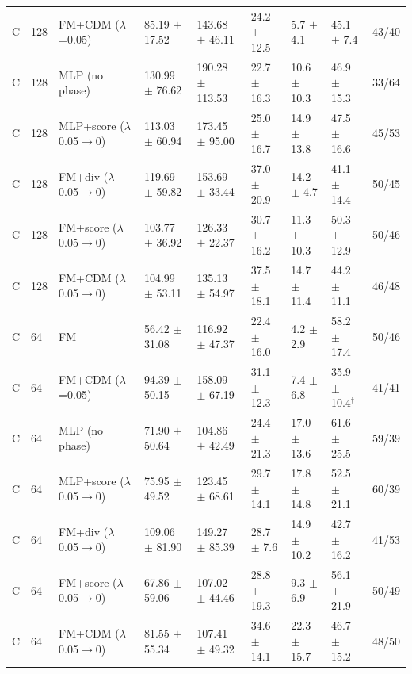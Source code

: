 \begin{tabular}{lllllllll}
C & 128 & FM+CDM ($\lambda$=0.05) & 85.19 $\pm$ 17.52 & 143.68 $\pm$ 46.11 & 24.2 $\pm$ 12.5 & 5.7 $\pm$ 4.1 & 45.1 $\pm$ 7.4 & 43/40 \\
C & 128 & MLP (no phase) & 130.99 $\pm$ 76.62 & 190.28 $\pm$ 113.53 & 22.7 $\pm$ 16.3 & 10.6 $\pm$ 10.3 & 46.9 $\pm$ 15.3 & 33/64 \\
C & 128 & MLP+score ($\lambda$ 0.05$\to$0) & 113.03 $\pm$ 60.94 & 173.45 $\pm$ 95.00 & 25.0 $\pm$ 16.7 & 14.9 $\pm$ 13.8 & 47.5 $\pm$ 16.6 & 45/53 \\
C & 128 & FM+div ($\lambda$ 0.05$\to$0) & 119.69 $\pm$ 59.82 & 153.69 $\pm$ 33.44 & 37.0 $\pm$ 20.9 & 14.2 $\pm$ 4.7 & 41.1 $\pm$ 14.4 & 50/45 \\
C & 128 & FM+score ($\lambda$ 0.05$\to$0) & 103.77 $\pm$ 36.92 & 126.33 $\pm$ 22.37 & 30.7 $\pm$ 16.2 & 11.3 $\pm$ 10.3 & 50.3 $\pm$ 12.9 & 50/46 \\
C & 128 & FM+CDM ($\lambda$ 0.05$\to$0) & 104.99 $\pm$ 53.11 & 135.13 $\pm$ 54.97 & 37.5 $\pm$ 18.1 & 14.7 $\pm$ 11.4 & 44.2 $\pm$ 11.1 & 46/48 \\
C & 64 & FM & 56.42 $\pm$ 31.08 & 116.92 $\pm$ 47.37 & 22.4 $\pm$ 16.0 & 4.2 $\pm$ 2.9 & 58.2 $\pm$ 17.4 & 50/46 \\
C & 64 & FM+CDM ($\lambda$=0.05) & 94.39 $\pm$ 50.15 & 158.09 $\pm$ 67.19 & 31.1 $\pm$ 12.3 & 7.4 $\pm$ 6.8 & 35.9 $\pm$ 10.4$^\dagger$ & 41/41 \\
C & 64 & MLP (no phase) & 71.90 $\pm$ 50.64 & 104.86 $\pm$ 42.49 & 24.4 $\pm$ 21.3 & 17.0 $\pm$ 13.6 & 61.6 $\pm$ 25.5 & 59/39 \\
C & 64 & MLP+score ($\lambda$ 0.05$\to$0) & 75.95 $\pm$ 49.52 & 123.45 $\pm$ 68.61 & 29.7 $\pm$ 14.1 & 17.8 $\pm$ 14.8 & 52.5 $\pm$ 21.1 & 60/39 \\
C & 64 & FM+div ($\lambda$ 0.05$\to$0) & 109.06 $\pm$ 81.90 & 149.27 $\pm$ 85.39 & 28.7 $\pm$ 7.6 & 14.9 $\pm$ 10.2 & 42.7 $\pm$ 16.2 & 41/53 \\
C & 64 & FM+score ($\lambda$ 0.05$\to$0) & 67.86 $\pm$ 59.06 & 107.02 $\pm$ 44.46 & 28.8 $\pm$ 19.3 & 9.3 $\pm$ 6.9 & 56.1 $\pm$ 21.9 & 50/49 \\
C & 64 & FM+CDM ($\lambda$ 0.05$\to$0) & 81.55 $\pm$ 55.34 & 107.41 $\pm$ 49.32 & 34.6 $\pm$ 14.1 & 22.3 $\pm$ 15.7 & 46.7 $\pm$ 15.2 & 48/50 \\
\bottomrule
\end{tabular}
